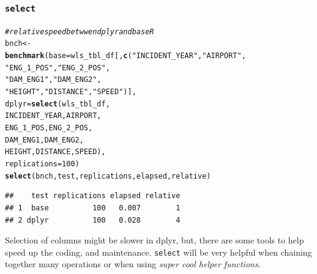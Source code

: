 \documentclass{beamer}\usepackage[]{graphicx}\usepackage[]{color}
\makeatletter
\newcommand{\hlnum}[1]{\textcolor[rgb]{0.686,0.059,0.569}{#1}}%
\newcommand{\hlstr}[1]{\textcolor[rgb]{0.192,0.494,0.8}{#1}}%
\newcommand{\hlcom}[1]{\textcolor[rgb]{0.678,0.584,0.686}{\textit{#1}}}%
\newcommand{\hlstd}[1]{\textcolor[rgb]{0.345,0.345,0.345}{#1}}%
\newcommand{\hlkwb}[1]{\textcolor[rgb]{0.69,0.353,0.396}{#1}}%
\newcommand{\hlkwc}[1]{\textcolor[rgb]{0.333,0.667,0.333}{#1}}%
\newcommand{\hlkwd}[1]{\textcolor[rgb]{0.737,0.353,0.396}{\textbf{#1}}}%
\newenvironment{kframe}{%
 \def\at@end@of@kframe{}%
 \ifinner\ifhmode%
  \def\at@end@of@kframe{\end{minipage}}%
  \begin{minipage}{\columnwidth}%
 \fi\fi%
 \def\FrameCommand##1{\hskip\@totalleftmargin \hskip-\fboxsep
 \colorbox{shadecolor}{##1}\hskip-\fboxsep
     \hskip-\linewidth \hskip-\@totalleftmargin \hskip\columnwidth}%
 \MakeFramed {\advance\hsize-\width
   \@totalleftmargin\z@ \linewidth\hsize
   \@setminipage}}%
 {\par\unskip\endMakeFramed%
 \at@end@of@kframe}
\newenvironment{knitrout}{}{} %
\makeatother
\begin{document}
\begin{frame}[fragile]
  \frametitle{{\tt select}}
\begin{knitrout}\footnotesize
{}\color{fgcolor}\begin{kframe}
\begin{alltt}
\hlcom{# relative speed betwwen dplyr and base R}
\hlstd{bnch} \hlkwb{<-}
  \hlkwd{benchmark}\hlstd{(}\hlkwc{base}  \hlstd{= wls_tbl_df[,} \hlkwd{c}\hlstd{(}\hlstr{"INCIDENT_YEAR"}\hlstd{,} \hlstr{"AIRPORT"}\hlstd{,}
                                   \hlstr{"ENG_1_POS"}\hlstd{,} \hlstr{"ENG_2_POS"}\hlstd{,}
                                   \hlstr{"DAM_ENG1"}\hlstd{,} \hlstr{"DAM_ENG2"}\hlstd{,}
                                   \hlstr{"HEIGHT"}\hlstd{,} \hlstr{"DISTANCE"}\hlstd{,} \hlstr{"SPEED"}\hlstd{)],}
            \hlkwc{dplyr} \hlstd{=} \hlkwd{select}\hlstd{(wls_tbl_df,}
                           \hlstd{INCIDENT_YEAR, AIRPORT,}
                           \hlstd{ENG_1_POS, ENG_2_POS,}
                           \hlstd{DAM_ENG1, DAM_ENG2,}
                           \hlstd{HEIGHT, DISTANCE, SPEED),}
            \hlkwc{replications} \hlstd{=} \hlnum{100}\hlstd{)}
\hlkwd{select}\hlstd{(bnch, test, replications, elapsed, relative)}
\end{alltt}
\begin{verbatim}
##    test replications elapsed relative
## 1  base          100   0.007        1
## 2 dplyr          100   0.028        4
\end{verbatim}
\end{kframe}
\end{knitrout}

Selection of columns might be slower in dplyr, but, there are some
tools to help speed up the coding, and maintenance.  {\tt select} will be very
helpful when chaining together many operations or when using \emph{super cool
helper functions}.
\end{frame} 
\end{document}
